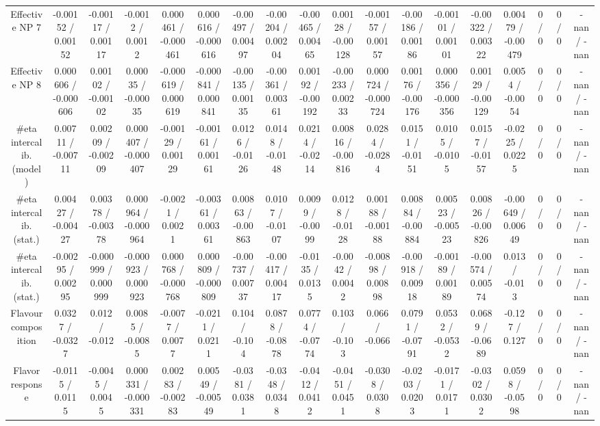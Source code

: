 \documentclass[10pt]{article}
\begin{document}
\begin{table}[htbp]
\begin{center}
\begin{tabular}{|c|c|c|c|c|c|c|c|c|c|c|c|c|c|c|c|c|c|}
  Effective NP 7 & -0.00152 / 0.00152 & -0.00117 / 0.00117 & -0.0012 / 0.0012 & 0.000461 / -0.000461 & 0.000616 / -0.000616 & -0.00497 / 0.00497 & -0.00204 / 0.00204 & -0.00465 / 0.00465 & 0.00128 / -0.00128 & -0.00157 / 0.00157 & -0.00186 / 0.00186 & -0.00101 / 0.00101 & -0.00322 / 0.00322 & 0.00479 / -0.00479 & 0 / 0 & 0 / 0 & -nan / -nan \\ 
  Effective NP 8 & 0.000606 / -0.000606 & 0.00102 / -0.00102 & 0.00035 / -0.00035 & -0.000619 / 0.000619 & -0.000841 / 0.000841 & -0.00135 / 0.00135 & -0.00361 / 0.00361 & 0.00192 / -0.00192 & -0.00233 / 0.00233 & 0.000724 / -0.000724 & 0.00176 / -0.00176 & 0.000356 / -0.000356 & 0.00129 / -0.00129 & 0.0054 / -0.0054 & 0 / 0 & 0 / 0 & -nan / -nan \\ 
  #eta intercalib. (model) & 0.00711 / -0.00711 & 0.00209 / -0.00209 & 0.000407 / -0.000407 & -0.00129 / 0.00129 & -0.00161 / 0.00161 & 0.0126 / -0.0126 & 0.0148 / -0.0148 & 0.0214 / -0.0214 & 0.00816 / -0.00816 & 0.0284 / -0.0284 & 0.0151 / -0.0151 & 0.0105 / -0.0105 & 0.0157 / -0.0157 & -0.0225 / 0.0225 & 0 / 0 & 0 / 0 & -nan / -nan \\ 
  #eta intercalib. (stat.) & 0.00427 / -0.00427 & 0.00378 / -0.00378 & 0.000964 / -0.000964 & -0.0021 / 0.0021 & -0.00361 / 0.00361 & 0.00863 / -0.00863 & 0.0107 / -0.0107 & 0.0099 / -0.0099 & 0.0128 / -0.0128 & 0.00188 / -0.00188 & 0.00884 / -0.00884 & 0.00523 / -0.00523 & 0.00826 / -0.00826 & -0.00649 / 0.00649 & 0 / 0 & 0 / 0 & -nan / -nan \\ 
  #eta intercalib. (stat.) & -0.00295 / 0.00295 & -0.000999 / 0.000999 & -0.000923 / 0.000923 & 0.000768 / -0.000768 & 0.000809 / -0.000809 & -0.00737 / 0.00737 & -0.00417 / 0.00417 & -0.0135 / 0.0135 & -0.0042 / 0.0042 & -0.00898 / 0.00898 & -0.00918 / 0.00918 & -0.00189 / 0.00189 & -0.00574 / 0.00574 & 0.013 / -0.013 & 0 / 0 & 0 / 0 & -nan / -nan \\ 
  Flavour composition & 0.0327 / -0.0327 & 0.012 / -0.012 & 0.0085 / -0.0085 & -0.0077 / 0.0077 & -0.0211 / 0.0211 & 0.104 / -0.104 & 0.0878 / -0.0878 & 0.0774 / -0.0774 & 0.103 / -0.103 & 0.066 / -0.066 & 0.0791 / -0.0791 & 0.0532 / -0.0532 & 0.0689 / -0.0689 & -0.127 / 0.127 & 0 / 0 & 0 / 0 & -nan / -nan \\ 
  Flavor response & -0.0115 / 0.0115 & -0.0045 / 0.0045 & 0.000331 / -0.000331 & 0.00283 / -0.00283 & 0.00549 / -0.00549 & -0.0381 / 0.0381 & -0.0348 / 0.0348 & -0.0412 / 0.0412 & -0.0451 / 0.0451 & -0.0308 / 0.0308 & -0.0203 / 0.0203 & -0.0171 / 0.0171 & -0.0302 / 0.0302 & 0.0598 / -0.0598 & 0 / 0 & 0 / 0 & -nan / -nan \\ 

\end{tabular}
\end{center}
\end{table}
\end{document}
